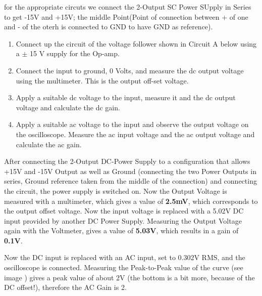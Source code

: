 



for the appropriate circuts we connect the 2-Output SC Power SUpply in Series to get -15V and +15V; the middle Point(Point of connection between + of one and - of the oterh is connected to GND to have GND as reference).


\begin{enumerate}
	

\item Connect up the circuit of the voltage follower shown in Circuit A below using a $\pm$ 15 V
supply for the Op-amp.
\item  Connect the input to ground, 0 Volts, and measure the dc output voltage using the multimeter. This is the output off-set voltage.
\item  Apply a suitable dc voltage to the input, measure it and the dc output voltage and calculate
the dc gain.
\item  Apply a suitable ac voltage to the input and observe the output voltage on the oscilloscope.
Measure the ac input voltage and the ac output voltage and calculate the ac gain.
\end{enumerate}



After connecting the 2-Output DC-Power Supply to a configuration that allows +15V and -15V Output as well as Ground (connecting the two Power Outputs in series, Ground reference taken from the middle of the connection) and connecting the circuit, the power supply is switched on.
Now the Output Voltage is measured with a multimeter, which gives a value of \textbf{2.5mV}, which corresponds to the output offset voltage.
\newline
Now the input voltage is replaced with a 5.02V DC input provided by another DC Power Supply.
\newline
Measuring the Output Voltage again with the Voltmeter, gives a value of \textbf{5.03V}, which results in a gain of \textbf{0.1V}.


Now the DC input is replaced with an AC input, set to 0.302V RMS, and the oscilloscope is connected. Measuring the Peak-to-Peak value of the curve (see image  ) gives a peak value of about 2V (the bottom is a bit more, because of the DC offset!), therefore the AC Gain is 2.




